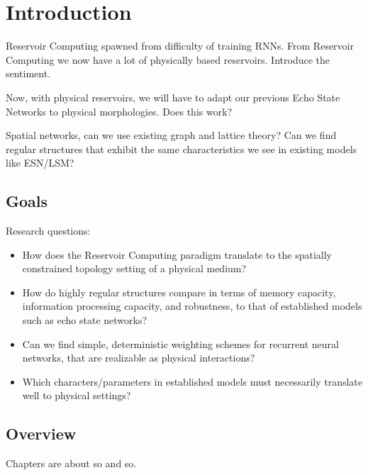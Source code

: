 \chapter{Introduction}

Reservoir Computing spawned from difficulty of training RNNs. From Reservoir
Computing we now have a lot of physically based reservoirs. Introduce the
sentiment.

Now, with physical reservoirs, we will have to adapt our previous Echo State
Networks to physical morphologies. Does this work?

Spatial networks, can we use existing graph and lattice theory? Can we find
regular structures that exhibit the same characteristics we see in existing
models like ESN/LSM?

\section{Goals}

Research questions:

\begin{itemize}
\item How does the Reservoir Computing paradigm translate to the spatially
constrained topology setting of a physical medium?
\item How do highly regular structures compare in terms of memory capacity,
information processing capacity, and robustness, to that of established models
such as echo state networks?
\item Can we find simple, deterministic weighting schemes for recurrent neural
networks, that are realizable as physical interactions?
\item Which characters/parameters in established models must necessarily
translate well to physical settings?
\end{itemize}

\section{Overview}

Chapters are about so and so.

